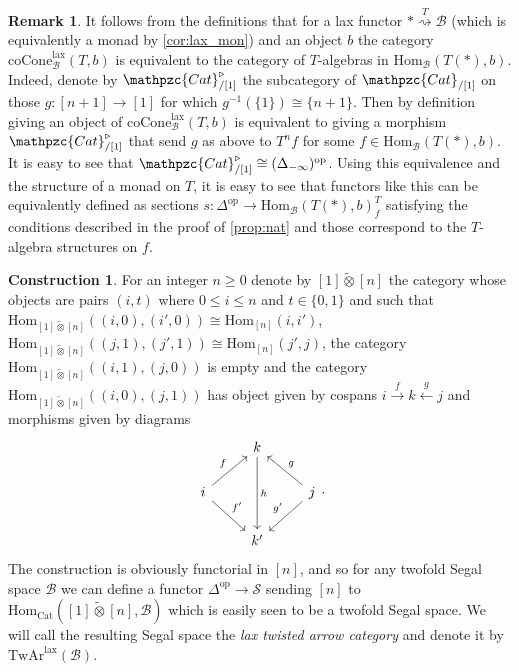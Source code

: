 \documentclass[a4paper, reqno]{amsart}
\theoremstyle{definition}
\newtheorem{remark}[theorem]{Remark}
\newtheorem{construction}[theorem]{Construction}
\newcommand\cB{\mathscr B}
\newcommand\cS{\mathscr S}
\newcommand\mor{\mathrm{Hom}}
\newcommand\op{\mathrm{op}}
\newcommand\cat{\mathrm{Cat}}
\newcommand\ccat{\mathpzc{Cat}}
\newcommand\lax{\mathrm{lax}}
\newcommand\twar{\mathrm{TwAr}}
\newcommand\coc{\mathrm{coCone}}
\begin{document}
\begin{remark}\label{rem:monad_mod}
It follows from the definitions that for a lax functor $*\overset{T}{\rightsquigarrow}\cB$ (which is equivalently a monad by \cref{cor:lax_mon}) and an object $b$ the category $\coc_\cB^\lax(T,b)$ is equivalent to the category of $T$-algebras in $\mor_\cB(T(*),b)$. Indeed, denote by $\ccat^\triangleright_{/[1]}$ the subcategory of $\ccat_{/[1]}$ on those $g:[n+1]\rightarrow[1]$ for which $g^{-1}(\{1\})\cong\{n+1\}$. Then by definition giving an object of $\coc_\cB^\lax(T,b)$ is equivalent to giving a morphism $\ccat^\triangleright_{/[1]}$ that send $g$ as above to $T^n f$ for some $f\in\mor_\cB(T(*),b)$. It is easy to see that $\ccat^\triangleright_{/[1]}\cong (\Delta_{-\infty})^\op$. Using this equivalence and the structure of a monad on $T$, it is easy to see that functors like this can be equivalently defined as sections $s:\Delta^\op\rightarrow\mor_{\cB}(T(*),b)^T_f$ satisfying the conditions described in the proof of \cref{prop:nat} and those correspond to the $T$-algebra structures on $f$.
\end{remark}
\begin{construction}
For an integer $n\geq0$ denote by $[1]\widetilde{\otimes}[n]$ the category whose objects are pairs $(i,t)$ where $0\leq i\leq n$ and $t\in\{0,1\}$ and such that $\mor_{[1]\widetilde{\otimes}[n]}((i,0),(i',0))\cong\mor_{[n]}(i,i')$, $\mor_{[1]\widetilde{\otimes}[n]}((j,1),(j',1))\cong\mor_{[n]}(j',j)$, the category $\mor_{[1]\widetilde{\otimes}[n]}((i,1),(j,0))$ is empty and the category $\mor_{[1]\widetilde{\otimes}[n]}((i,0),(j,1))$ has object given by cospans $i\xrightarrow{f}k\xleftarrow{g}j$ and morphisms given by diagrams
\[
\begin{tikzcd}
{}&k\arrow[dd, "h"]\\
i\arrow[ur, "f"]\arrow[dr, "f'"]&{}&j\arrow[ul, "g" swap]\arrow[dl, "g'" swap]\\
{}&k'
\end{tikzcd}.
\]
The construction is obviously functorial in $[n]$, and so for any twofold Segal space $\cB$ we can define a functor $\Delta^\op\rightarrow\cS$ sending $[n]$ to $\mor_\cat([1]\widetilde{\otimes}[n],\cB)$ which is easily seen to be a twofold Segal space. We will call the resulting Segal space the \textit{lax twisted arrow category} and denote it by $\twar^\lax(\cB)$.
\end{construction}
\end{document}
